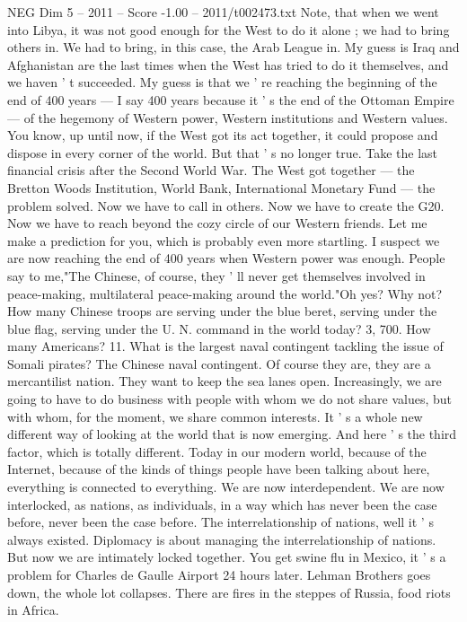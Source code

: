 \begin{textsample}{NEG Dim 5 – 2011 – Score -1.00 – 2011/t002473.txt}
Note, that when we went into Libya, it was not good enough for the West to do it alone ; we had to bring others in.
We had to bring, in this case, the Arab League in.
My guess is Iraq and Afghanistan are the last times when the West has tried to do it themselves, and we haven ' t succeeded.
My guess is that we ' re reaching the beginning of the end of 400 years — I say 400 years because it ' s the end of the Ottoman Empire — of the hegemony of Western power, Western institutions and Western values.
You know, up until now, if the West got its act together, it could propose and dispose in every corner of the world.
But that ' s no longer true.
Take the last financial crisis after the Second World War.
The West got together — the Bretton Woods Institution, World Bank, International Monetary Fund — the problem solved.
Now we have to call in others.
Now we have to create the G20.
Now we have to reach beyond the cozy circle of our Western friends.
Let me make a prediction for you, which is probably even more startling.
I suspect we are now reaching the end of 400 years when Western power was enough.
People say to me,"The Chinese, of course, they ' ll never get themselves involved in peace-making, multilateral peace-making around the world."Oh yes?
Why not?
How many Chinese troops are serving under the blue beret, serving under the blue flag, serving under the U.
N. command in the world today? 3, 700.
How many Americans? 11.
What is the largest naval contingent tackling the issue of Somali pirates?
The Chinese naval contingent.
Of course they are, they are a mercantilist nation.
They want to keep the sea lanes open.
Increasingly, we are going to have to do business with people with whom we do not share values, but with whom, for the moment, we share common interests.
It ' s a whole new different way of looking at the world that is now emerging.
And here ' s the third factor, which is totally different.
Today in our modern world, because of the Internet, because of the kinds of things people have been talking about here, everything is connected to everything.
We are now interdependent.
We are now interlocked, as nations, as individuals, in a way which has never been the case before, never been the case before.
The interrelationship of nations, well it ' s always existed.
Diplomacy is about managing the interrelationship of nations.
But now we are intimately locked together.
You get swine flu in Mexico, it ' s a problem for Charles de Gaulle Airport 24 hours later.
Lehman Brothers goes down, the whole lot collapses.
There are fires in the steppes of Russia, food riots in Africa.

\end{textsample}

